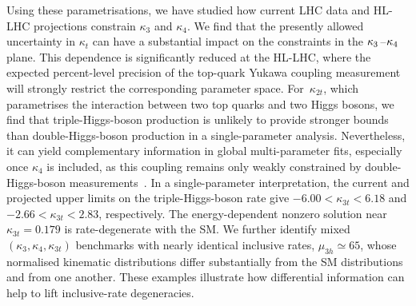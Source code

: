 \documentclass{SciPost}
\providecommand{\DIFaddtex}[1]{{\protect\color{red} #1}} %
\providecommand{\DIFdeltex}[1]{} %
\providecommand{\DIFaddbegin}{} %
\providecommand{\DIFaddend}{} %
\providecommand{\DIFdelbegin}{} %
\providecommand{\DIFdelend}{} %
\providecommand{\DIFadd}[1]{\texorpdfstring{\DIFaddtex{#1}}{#1}} %
\providecommand{\DIFdel}[1]{\texorpdfstring{\DIFdeltex{#1}}{}} %
\begin{document}
Using these \DIFdelbegin \DIFdel{parameterisations}\DIFdelend \DIFaddbegin \DIFadd{parametrisations}\DIFaddend , we have \DIFdelbegin \DIFdel{investigated the sensitivity to $\kappa_3$ and $\kappa_4$ using current and projected LHC data}\DIFdelend \DIFaddbegin \DIFadd{studied how current LHC data and HL-LHC projections constrain $\kappa_3$ and $\kappa_4$}\DIFaddend . We find that the presently allowed uncertainty in $\kappa_t$ can have a substantial impact on the constraints in the $\kappa_3\hspace{0.25mm}$--$\hspace{0.25mm}\kappa_4$ plane. This dependence is significantly reduced at the HL-LHC, where the expected percent-level precision of the top-quark Yukawa coupling measurement will strongly restrict the corresponding parameter space. For~$\kappa_{2t}$, which parametrises the interaction between two top quarks and two Higgs bosons, we find that \DIFdelbegin \DIFdel{triple-Higgs }\DIFdelend \DIFaddbegin \DIFadd{triple-Higgs-boson }\DIFaddend production is unlikely to provide stronger bounds than \DIFdelbegin \DIFdel{double-Higgs }\DIFdelend \DIFaddbegin \DIFadd{double-Higgs-boson }\DIFaddend production in a single-parameter analysis. Nevertheless, it can yield complementary information in global multi-parameter fits, especially once $\kappa_4$ is included, as this coupling remains only weakly constrained by \DIFdelbegin \DIFdel{double-Higgs }\DIFdelend \DIFaddbegin \DIFadd{double-Higgs-boson }\DIFaddend measurements~\cite{Bizon:2018syu,Borowka:2018pxx,Li:2024iio,Ding:2026qto}. \DIFaddbegin \DIFadd{In a single-parameter interpretation, the current and projected upper limits on the triple-Higgs-boson rate give $-6.00<\kappa_{3t}<6.18$ and $-2.66<\kappa_{3t}<2.83$, respectively. The energy-dependent nonzero solution near $\kappa_{3t}=0.179$ is rate-degenerate with the SM. }\DIFaddend \DIFdelbegin \DIFdel{We further demonstrate that parameter choices for $\kappa_3$ and $\kappa_4$ yielding nearly identical inclusive $gg \to 3h$ cross sections can still produce substantial differences in differential observables. Similar effects are observed for variations of $\kappa_{2t}$.}\DIFdelend \DIFaddbegin \DIFadd{We further identify mixed $(\kappa_3,\kappa_4,\kappa_{3t})$ benchmarks with nearly identical inclusive rates, $\mu_{3h}\simeq65$, whose normalised kinematic distributions differ substantially from the SM distributions and from one another. These examples illustrate how differential information can help to lift inclusive-rate degeneracies.}\DIFaddend
\end{document}
